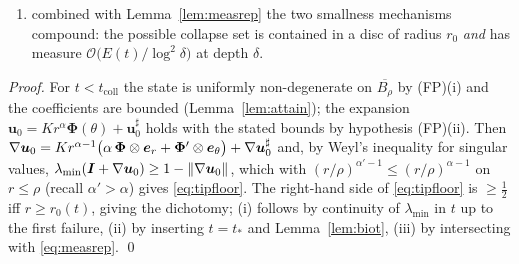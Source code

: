 \begin{proposition}
\begin{enumerate}
\begin{equation}
              \end{equation}
              an explicit inequality between computable numbers; granted \eqref{eq:scsafe}, the destabilising field of
              Lemma~\ref{lem:biot} lives entirely in the region where \eqref{eq:tipfloor} keeps the state uniformly
              non-degenerate, and the ordering $t_c<t_{\mathrm{coll}}$ can fail only if the tip disc
              \eqref{eq:tipradius} collapses before the free-face stretch reaches $\lambda_\star$;
        \item[\textup{(iii)}] combined with Lemma~\ref{lem:measrep} the two smallness mechanisms compound: the
              possible collapse set is contained in a disc of radius $r_0$ \emph{and} has measure
              $\mathcal O\big(E(t)/\log^2\delta\big)$ at depth $\delta$.
    \end{enumerate}
\end{proposition}

\begin{proof}
    For $t<t_{\mathrm{coll}}$ the state is uniformly non-degenerate on $\overline{B_\rho}$ by (FP)(i) and the
    coefficients are bounded (Lemma~\ref{lem:attain}); the expansion
    $\bm u_0=K r^\alpha\bm\Phi(\theta)+\bm u_0^\sharp$ holds with the stated bounds by hypothesis (FP)(ii). Then
    $\nabla\bm u_0=K r^{\alpha-1}\big(\alpha\,\bm\Phi\otimes\bm e_r+\bm\Phi'\otimes\bm e_\theta\big)+\nabla\bm u_0^\sharp$
    and, by Weyl's inequality for singular values,
    $\lambda_{\min}(\bm I+\nabla\bm u_0)\ge1-\|\nabla\bm u_0\|$, which with
    $(r/\rho)^{\alpha'-1}\le(r/\rho)^{\alpha-1}$ on $r\le\rho$ (recall $\alpha'>\alpha$) gives \eqref{eq:tipfloor}.
    The right-hand side of \eqref{eq:tipfloor} is $\ge\tfrac12$ iff $r\ge r_0(t)$, giving the dichotomy; (i) follows
    by continuity of $\lambda_{\min}$ in $t$ up to the first failure, (ii) by inserting $t=t_*$ and
    Lemma~\ref{lem:biot}, (iii) by intersecting with \eqref{eq:measrep}. \qed
\end{proof}


